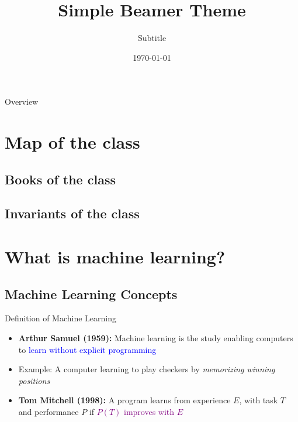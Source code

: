 \documentclass[aspectratio=169, xcolor=dvipsnames]{beamer}
\title[short title]{Simple Beamer Theme}
\subtitle{Subtitle}
\institute[UMD]
{ Department of Computer Science\\ University of Maryland, College Park%
}
\date{\today} %
\begin{document}
  \begin{frame}{Overview}
    \tableofcontents
  \end{frame}

  \section{Map of the class}

  \subsection{Books of the class}

  \subsection{Invariants of the class}

  \section{What is machine learning?}

  \subsection{Machine Learning Concepts}

  \begin{frame}{Definition of Machine Learning}
    \begin{itemize}
      \item \textbf{Arthur Samuel (1959):} Machine learning is the study
        enabling computers to \textcolor{blue}{learn without explicit
        programming}

      \item Example: A computer learning to play checkers by \textit{memorizing
        winning positions}

      \item \textbf{Tom Mitchell (1998):} A program learns from experience $E$, with
        task $T$ and performance $P$ if \textcolor{purple}{$P(T)$ improves with
        $E$}
    \end{itemize}
  \end{frame}
\end{document}
